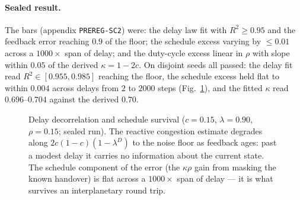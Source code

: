 \documentclass[11pt]{article}
\theoremstyle{definition}
\theoremstyle{remark}
\begin{document}
\paragraph{Sealed result.}
The bars (appendix \texttt{PREREG-SC2}) were: the delay law fit with
$R^2\ge0.95$ and the feedback error reaching $0.9$ of the floor; the
schedule excess varying by $\le0.01$ across a $1000\times$ span of delay;
and the duty-cycle excess linear in $\rho$ with slope within $0.05$ of the
derived $\kappa=1-2c$. On disjoint seeds all passed: the delay fit read
$R^2\in[0.955,0.985]$ reaching the floor, the schedule excess held flat to
within $0.004$ across delays from $2$ to $2000$ steps
(Fig.~\ref{fig:sc2}), and the fitted $\kappa$ read $0.696$--$0.704$
against the derived $0.70$.

\begin{figure}[t]
\centering
{}
\caption{Delay decorrelation and schedule survival ($c=0.15$,
$\lambda=0.90$, $\rho=0.15$; sealed run). The reactive congestion
estimate degrades along $2c(1{-}c)(1{-}\lambda^{D})$ to the noise floor
as feedback ages: past a modest delay it carries no information about the
current state. The schedule component of the error (the $\kappa\rho$
gain from masking the known handover) is flat across a $1000\times$ span
of delay --- it is what survives an interplanetary round trip.}
\label{fig:sc2}
\end{figure}
\end{document}
